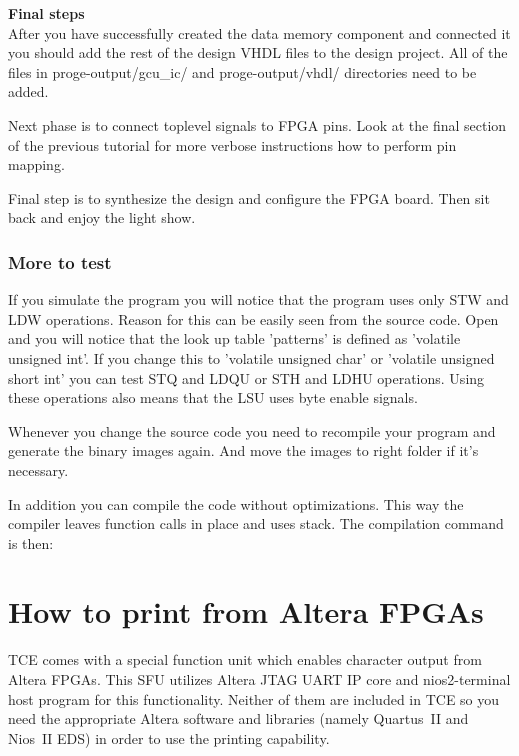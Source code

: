 \documentclass[twoside]{tceusermanual}
\begin{document}
\textbf{Final steps} \\
After you have successfully created the data memory component and connected it
you should add the rest of the design VHDL files to the design project. All of
the files in proge-output/gcu\_ic/ and proge-output/vhdl/ directories need to
be added.

Next phase is to connect toplevel signals to FPGA pins. Look at the final
section of the previous tutorial for more verbose instructions how to
perform pin mapping.

Final step is to synthesize the design and configure the FPGA board. Then sit
back and enjoy the light show.

\subsubsection{More to test}
If you simulate the program you will notice that the program uses only STW and
LDW operations. Reason for this can be easily seen from the source code. Open
 and you will notice that the look up table 'patterns' is
defined as 'volatile unsigned int'. If you change this to 'volatile unsigned
char' or 'volatile unsigned short int' you can test STQ and LDQU or STH and
LDHU operations. Using these operations also means that the LSU uses byte
enable signals.

Whenever you change the source code you need to recompile your program and
generate the binary images again. And move the images to right folder if it's
necessary.

In addition you can compile the code without optimizations. This way the
compiler leaves function calls in place and uses stack. The compilation
command is then:





\section{How to print from Altera FPGAs}

TCE comes with a special function unit which enables character output
from Altera FPGAs. This SFU utilizes Altera JTAG UART IP core and
nios2-terminal host program for this functionality. Neither of them
are included in TCE so you need the appropriate Altera software and
libraries (namely Quartus~II and Nios~II EDS) in order to use the
printing capability.
\end{document}
